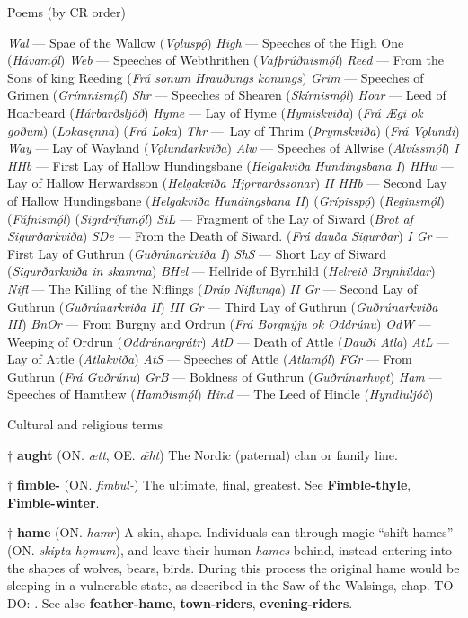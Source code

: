 Poems (by CR order)

\emph{Wal} — Spae of the Wallow (\emph{Vǫluspǫ́})
\emph{High} — Speeches of the High One (\emph{Hávamǫ́l})
\emph{Web} — Speeches of Webthrithen (\emph{Vafþrúðnismǫ́l})
\emph{Reed} — From the Sons of king Reeding (\emph{Frá sonum Hrauðungs konungs})
\emph{Grim} — Speeches of Grimen (\emph{Grímnismǫ́l})
\emph{Shr} — Speeches of Shearen (\emph{Skírnismǫ́l})
\emph{Hoar} — Leed of Hoarbeard (\emph{Hárbarðsljóð})
\emph{Hyme} — Lay of Hyme (\emph{Hymiskviða})
(\emph{Frá Ægi ok goðum})
(\emph{Lokasęnna})
(\emph{Frá Loka})
\emph{Thr} — Lay of Thrim (\emph{Þrymskviða})
(\emph{Frá Vǫlundi})
\emph{Way} — Lay of Wayland (\emph{Vǫlundarkviða})
\emph{Alw} — Speeches of Allwise (\emph{Alvíssmǫ́l})
\emph{I HHb} — First Lay of Hallow Hundingsbane (\emph{Helgakviða Hundingsbana I})
\emph{HHw} — Lay of Hallow Herwardsson (\emph{Helgakviða Hjǫrvarðssonar})
\emph{II HHb} — Second Lay of Hallow Hundingsbane (\emph{Helgakviða Hundingsbana II})
(\emph{Grípisspǫ́})
(\emph{Reginsmǫ́l})
(\emph{Fáfnismǫ́l})
(\emph{Sigrdrífumǫ́l})
\emph{SiL} — Fragment of the Lay of Siward (\emph{Brot af Sigurðarkviða})
\emph{SDe} — From the Death of Siward. (\emph{Frá dauða Sigurðar})
\emph{I Gr} — First Lay of Guthrun (\emph{Guðrúnarkviða I})
\emph{ShS} — Short Lay of Siward (\emph{Sigurðarkviða in skamma})
\emph{BHel} — Hellride of Byrnhild (\emph{Helreið Brynhildar})
\emph{Nifl} — The Killing of the Niflings (\emph{Dráp Niflunga})
\emph{II Gr} — Second Lay of Guthrun (\emph{Guðrúnarkviða II})
\emph{III Gr} — Third Lay of Guthrun (\emph{Guðrúnarkviða III})
\emph{BnOr} — From Burgny and Ordrun (\emph{Frá Borgnýju ok Oddrúnu})
\emph{OdW} — Weeping of Ordrun (\emph{Oddrúnargrátr})
\emph{AtD} — Death of Attle (\emph{Dauði Atla})
\emph{AtL} — Lay of Attle (\emph{Atlakviða})
\emph{AtS} — Speeches of Attle (\emph{Atlamǫ́l})
\emph{FGr} — From Guthrun (\emph{Frá Guðrúnu})
\emph{GrB} — Boldness of Guthrun (\emph{Guðrúnarhvǫt})
\emph{Ham} — Speeches of Hamthew (\emph{Hamðismǫ́l})
\emph{Hind} — The Leed of Hindle (\emph{Hyndluljóð})



Cultural and religious terms

† \textbf{aught} (ON. \emph{ætt}, OE. \emph{ǣht})
 The Nordic (paternal) clan or family line.

† \textbf{fimble-} (ON. \emph{fimbul-})
 The ultimate, final, greatest. See \textbf{Fimble-thyle}, \textbf{Fimble-winter}.

† \textbf{hame} (ON. \emph{hamr})
 A skin, shape. Individuals can through magic “shift hames” (ON. \emph{skipta hǫmum}), and leave their human \emph{hames} behind, instead entering into the shapes of wolves, bears, birds. During this process the original hame would be sleeping in a vulnerable state, as described in the Saw of the Walsings, chap. TO-DO: . See also \textbf{feather-hame}, \textbf{town-riders}, \textbf{evening-riders}.

